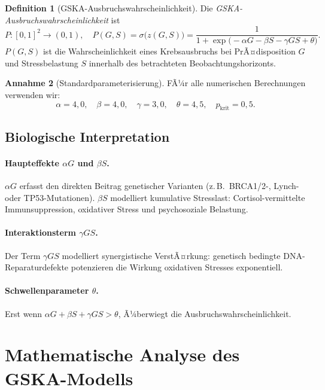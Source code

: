 ﻿\documentclass[12pt, a4paper]{article}
\theoremstyle{definition}
\newtheorem{definition}{Definition}[section]
\newtheorem{annahme}[definition]{Annahme}
\theoremstyle{remark}
\begin{document}
\begin{definition}[GSKA-Ausbruchswahrscheinlichkeit]
\label{def:P_GSKA}
Die \emph{GSKA-Ausbruchswahrschein\-lichkeit} ist
\[
  P : [0,1]^2 \to (0,1), \quad P(G,S) = \sigma\!\bigl(z(G,S)\bigr) =
  \frac{1}{1 + \exp\!\bigl(-\alpha G - \beta S - \gamma G S + \theta\bigr)}.
\]
$P(G,S)$ ist die Wahrscheinlichkeit eines Krebsausbruchs bei PrÃ¤disposition $G$
und Stressbelastung $S$ innerhalb des betrachteten Beobachtungshorizonts.
\end{definition}

\begin{annahme}[Standardparameterisierung]
\label{annahme:parameter}
FÃ¼r alle numerischen Berechnungen verwenden wir:
\[
  \alpha = 4{,}0,\quad \beta = 4{,}0,\quad \gamma = 3{,}0,\quad
  \theta = 4{,}5,\quad p_{\mathrm{krit}} = 0{,}5.
\]
\end{annahme}

\subsection{Biologische Interpretation}

\paragraph{Haupteffekte $\alpha G$ und $\beta S$.}
$\alpha G$ erfasst den direkten Beitrag genetischer Varianten (z.\,B.\ BRCA1/2-,
Lynch- oder TP53-Mutationen). $\beta S$ modelliert kumulative Stresslast:
Cortisol-vermittelte Immunsuppression, oxidativer Stress und psychosoziale Belastung.

\paragraph{Interaktionsterm $\gamma GS$.}
Der Term $\gamma GS$ modelliert synergistische VerstÃ¤rkung: genetisch bedingte
DNA-Reparaturdefekte potenzieren die Wirkung oxidativen Stresses exponentiell.

\paragraph{Schwellenparameter $\theta$.}
Erst wenn $\alpha G + \beta S + \gamma GS > \theta$, Ã¼berwiegt die Ausbruchswahrscheinlichkeit.


\section{Mathematische Analyse des GSKA-Modells}
\label{sec:analyse}
\end{document}
